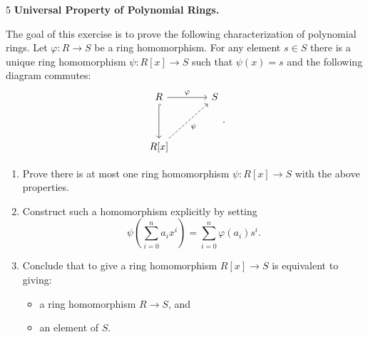 \documentclass[Notebook.tex]{subfiles}
\begin{document}
\newpage

\begin{problem}{5}
    \textbf{Universal Property of Polynomial Rings.} 
    
    The goal of this exercise is to prove the following characterization of polynomial rings. Let $\varphi\colon R \to S$ be a ring homomorphism. For any element $s \in S$ there is a unique ring homomorphism $\psi\colon R[x] \to S$ such that $\psi(x) = s$ and the following diagram commutes:
    \[
    \begin{tikzcd}[row sep = 3.5em, column sep = 3.5em]
        R \arrow[r, "\varphi"] \arrow[d, hook] & S  \\
        R[x] \arrow[ur, dashed, swap,"\psi"]
    \end{tikzcd}.
    \]
    \begin{enumerate}[label=(\alph*),ref=\theenumi\alph*]

        \item Prove there is at most one ring homomorphism $\psi:R[x] \to S$ with the above properties. 
        \item Construct such a homomorphism explicitly by setting
        \[
        \psi\!\left(\sum_{i=0}^n a_i x^i\right)=\sum_{i=0}^n \varphi(a_i)s^i.
        \]
        \item Conclude that to give a ring homomorphism $R[x]\to S$ is equivalent to giving:
        \begin{itemize}
            \item a ring homomorphism $R\to S$, and
            \item an element of $S$.
        \end{itemize}
    \end{enumerate}
\end{problem}
\end{document}
